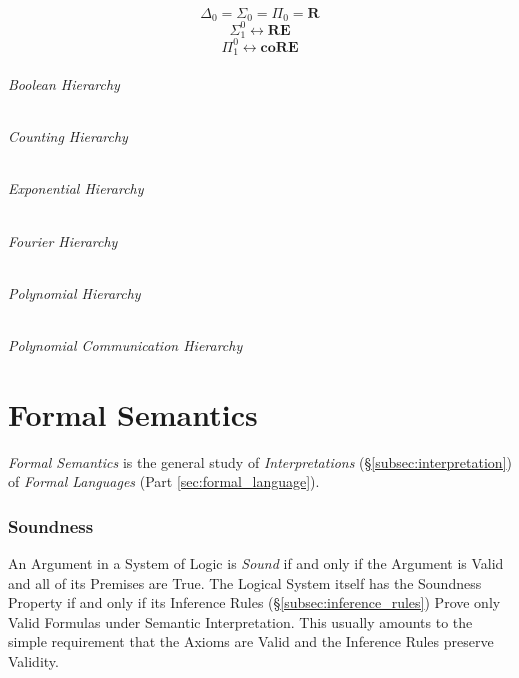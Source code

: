 \documentclass{article}
\begin{document}
\[
    \Delta_0 = \Sigma_0 = \Pi_0 = \mathbf{R}
\]\[
    \Sigma_1^0 \leftrightarrow \mathbf{RE}
\]\[
    \Pi_1^0 \leftrightarrow \mathbf{coRE}
\]

\paragraph{Boolean Hierarchy}

\paragraph{Counting Hierarchy}

\paragraph{Exponential Hierarchy}

\paragraph{Fourier Hierarchy}

\paragraph{Polynomial Hierarchy}

\paragraph{Polynomial Communication Hierarchy}

\part{Formal Semantics}

\emph{Formal Semantics} is the general study of \emph{Interpretations}
(\S\ref{subsec:interpretation}) of \emph{Formal Languages} (Part
\ref{sec:formal_language}).

\section{Soundness}\label{sec:soundness}

An Argument in a System of Logic is \emph{Sound} if and only if the
Argument is Valid and all of its Premises are True. The Logical System
itself has the Soundness Property if and only if its Inference Rules
(\S\ref{subsec:inference_rules}) Prove only Valid Formulas under
Semantic Interpretation. This usually amounts to the simple
requirement that the Axioms are Valid and the Inference Rules preserve
Validity.
\end{document}
